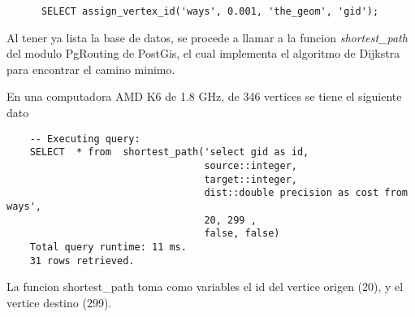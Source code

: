     \begin{center}
      \begin{verbatim}
      SELECT assign_vertex_id('ways', 0.001, 'the_geom', 'gid');
      \end{verbatim}
    \end{center}

    Al tener ya lista la base de datos, se procede a llamar a la funcion \emph{shortest\_path} del modulo PgRouting  de PostGis, el cual implementa el algoritmo de Dijkstra para encontrar el camino minimo. 

    En una computadora AMD K6 de 1.8 GHz, de 346 vertices se tiene el siguiente dato

    \begin{center}
      \begin{verbatim}
    -- Executing query:
    SELECT  * from  shortest_path('select gid as id, 
                                  source::integer,
                                  target::integer, 
                                  dist::double precision as cost from ways',
                                  20, 299 , 
                                  false, false)
    Total query runtime: 11 ms.
    31 rows retrieved.
      \end{verbatim}
    \end{center}

    La funcion shortest\_path toma como variables el id del vertice origen (20), y el vertice destino (299).

  








